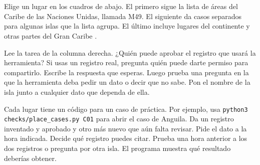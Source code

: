 \chapter{}
\label{app:places}

{Elige un lugar en los cuadros de abajo. El primero sigue la lista de áreas del Caribe de las Naciones Unidas, llamada M49. El siguiente da casos separados para algunas islas que la lista agrupa. El último incluye lugares del continente y otras partes del Gran Caribe \citep{m49,caricom,acs}.}

{Lee la tarea de la columna derecha. ¿Quién puede aprobar el registro que usará la herramienta? Si usas un registro real, pregunta quién puede darte permiso para compartirlo. Escribe la respuesta que esperas. Luego prueba una pregunta en la que la herramienta deba pedir un dato o decir que no sabe. Pon el nombre de la isla junto a cualquier dato que dependa de ella.}

{Cada lugar tiene un código para un caso de práctica. Por ejemplo, usa \texttt{python3 checks/place\_cases.py C01} para abrir el caso de Anguila. Da un registro inventado y aprobado y otro más nuevo que aún falta revisar. Pide el dato a la hora indicada. Decide qué registro puedes citar. Prueba una hora anterior a los dos registros o pregunta por otra isla. El programa muestra qué resultado deberías obtener.}

\newcommand{\PlaceTable}[1]{\small
\begin{longtable}{@{}L{.30\textwidth}L{.66\textwidth}@{}}
\toprule
\B{Place or area}{Lugar o área} & \B{Assignment and check}{Actividad y comprobación}\\
\midrule\endhead
\bottomrule\endlastfoot

\end{longtable}
\normalsize}
